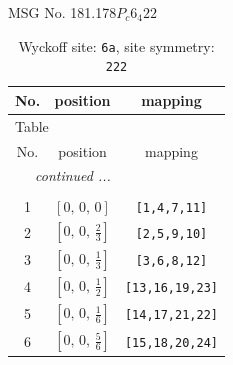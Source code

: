 \documentclass[fleqn,8pt]{jsarticle}
\begin{document}
\setcounter{MaxMatrixCols}{32}

\renewcommand{\tablename}{Table~}
\renewcommand{\figurename}{Figure~}
\begin{center}
\LARGE
MSG No. 181.178\quad$P_{c}6_{4}22$
\end{center}
\renewcommand{\arraystretch}{1.2}
\begin{longtable}{ccc}
\caption{Wyckoff site: {\tt 6a}, site symmetry: {\tt 222}}
 \\
 \hline \hline
No. & position & mapping \\ \hline \endfirsthead

\multicolumn{2}{l}{\tablename\ \thetable{}} \\
 \hline \hline
No. & position & mapping \\ \hline \endhead

 \hline \hline
\multicolumn{2}{r}{\footnotesize\it continued ...} \\ \endfoot

 \hline \hline
\multicolumn{2}{r}{} \\ \endlastfoot

1 & $\left[ 0,\, 0,\, 0 \right]$ & {\tt [1,4,7,11]} \\ \hline
2 & $\left[ 0,\, 0,\, \frac{2}{3} \right]$ & {\tt [2,5,9,10]} \\ \hline
3 & $\left[ 0,\, 0,\, \frac{1}{3} \right]$ & {\tt [3,6,8,12]} \\ \hline
4 & $\left[ 0,\, 0,\, \frac{1}{2} \right]$ & {\tt [13,16,19,23]} \\ \hline
5 & $\left[ 0,\, 0,\, \frac{1}{6} \right]$ & {\tt [14,17,21,22]} \\ \hline
6 & $\left[ 0,\, 0,\, \frac{5}{6} \right]$ & {\tt [15,18,20,24]} \\
\end{longtable}
\renewcommand{\arraystretch}{1.2}
\end{document}
